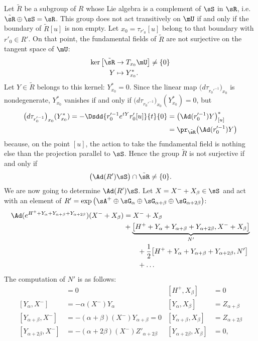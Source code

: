 Let $\tilde R$ be a subgroup of $R$ whose Lie algebra is a complement of $\sS$ in $\sR$, i.e. $\tilde{\sR}\oplus\sS=\sR$. This group does not act transitively on $\mU$ if and only if the boundary of $\tilde R[u]$ is non empty. Let $x_0=\tau_{r'_0}[u]$ belong to that boundary with $r'_0\in R'$. On that point, the fundamental fields of $\tilde R$ are not surjective on the tangent space of $\mU$:
\[
	\begin{split}
		\ker\big[ \tilde{\sR}&\to T_{x_0}\mU \big] \neq\{ 0 \}\\
		Y&\mapsto Y^*_{x_0}.
	\end{split}
\]
Let $Y\in\tilde R$ belongs to this kernel: $Y^*_{x_0}=0$. Since the linear map $\big( d\tau_{r_0'^{-1}} \big)_{x_0}$ is nondegenerate, $Y^*_{x_0}$ vanishes if and only if $\big( d\tau_{r_0'^{-1}} \big)_{x_0}(Y^*_{x_0})=0$, but
\begin{equation}
	\begin{split}
		\big( d\tau_{r_0'^{-1}} \big)_{x_0}(Y^*_{x_0})=-\Dsdd{ r_0'^{-1} e^{tY}r_0'[u] }{t}{0}
		&=\big( \Ad(r_0'^{-1})Y \big)^*_{[u]}\\
		&=\pr_{\tilde{\sR}}\big( \Ad(r_0'^{-1})Y \big)
	\end{split}
\end{equation}
because, on the point $[u]$, the action to take the fundamental field is nothing else than the projection parallel to $\sS$. Hence the group $\tilde R$ is not surjective if and only if
\[
	\big( \Ad(R')\sS \big)\cap\tilde{\sR}\neq\{ 0 \}.
\]
We are now going to determine $\Ad(R')\sS$. Let $X=X^{-}+X_{\beta}\in\sS$ and act with an element of $R'=\exp\big( \sA^{+}\oplus\sG_{\alpha}\oplus\sG_{\alpha+\beta}\oplus\sG_{\alpha+2\beta}\big)$:
\[
	\begin{aligned}
		\Ad( e^{H^{+}+Y_{\alpha}+Y_{\alpha+\beta}+Y_{\alpha+2\beta}})(X^{-}+X_{\beta})
		 & =X^{-}+X_{\beta}                                                                                   \\
		 & +\underbrace{\big[ H^{+}+Y_{\alpha}+Y_{\alpha+\beta}+Y_{\alpha+2\beta},X^{-}+X_{\beta} \big]}_{N'} \\
		 & \qquad+\frac{ 1 }{2}\big[  H^{+}+Y_{\alpha}+Y_{\alpha+\beta}+Y_{\alpha+2\beta},N'\big]             \\
		 & \qquad+\ldots
	\end{aligned}
\]
The computation of $N'$ is as follows:
\begin{align*}
	[H^+,X^-]               & =0                                         & [H^{+},X_{\beta}]             & =0                 \\
	[Y_{\alpha},X^{-}]      & =-\alpha(X^{-})Y_{\alpha}                  & [Y_{\alpha},X_{\beta}]        & =Z_{\alpha+\beta}  \\
	[Y_{\alpha+\beta},X^-]  & =-(\alpha+\beta)(X^{-})Y_{\alpha+\beta}=0  & [Y_{\alpha+\beta},X_{\beta}]  & =Z_{\alpha+2\beta} \\
	[Y_{\alpha+2\beta},X^-] & =-(\alpha+2\beta)(X^{-})Z'_{\alpha+2\beta} & [Y_{\alpha+2\beta},X_{\beta}] & =0,
\end{align*}
